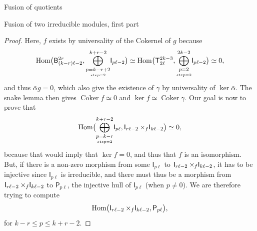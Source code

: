 \documentclass[reqno]{amsart}
\newcommand{\dl}[1]{\mathsf I_{#1}}
\newcommand{\dP}[1]{\mathsf P_{#1}}
\newcommand{\xf}{\times\hspace{-0.27em}_f}
\newcommand{\T}[2]{\mathsf{T}^{#1}_{#2}}
\newcommand{\B}[2]{\mathsf{B}^{#1}_{#2}}
\newcommand{\lc}{\ell}
\newcommand{\Hom}[1]{\text{\rm{Hom}}\big( #1 \big)}
\DeclareMathOperator{\Coker}{Coker}
\begin{document}
\begin{section}{Fusion of quotients}
\begin{subsection}{Fusion of two irreducible modules, first part}
\begin{proof}
Here, $f$ exists by universality of the Cokernel of $g$ because
\begin{equation}
\Hom{\B{2 r}{(k-r)\lc -2},\overset{k+r-2}{\underset{\underset{step=2}{p=k-r+2}}{\bigoplus}}\dl{p \lc -2}} \simeq \Hom{\T{2k -3}{2\lc},\overset{2k-2}{\underset{\underset{step=2}{p=2}}{\bigoplus}}\dl{p \lc -2}} \simeq 0,
\end{equation} 
and thus $\bar{\alpha}g = 0$, which also give the existence of $\gamma$ by universality of $\ker \bar\alpha$.
 The snake lemma then gives $\Coker{f} \simeq 0$ and $\ker f \simeq \Coker{\gamma}$. Our goal is now to prove that 
\begin{equation}\label{eq:IvsI.Goal}
 \Hom{\overset{k+r-2}{\underset{\underset{step=2}{p=k-r}}{\bigoplus}}\dl{p \lc },\dl{r \lc -2}\xf \dl{k \lc -2} } \simeq 0, 
\end{equation}
because that would imply that $\ker f = 0 $, and thus that $f$ is an isomorphism. But, if there is a non-zero morphism from some $\dl{p\lc}$ to $\dl{r \lc -2}\xf \dl{k \lc -2}$, it has to be injective since $\dl{p\lc}$ is irreducible, and there must thus be a morphism from $\dl{r \lc -2}\xf \dl{k \lc -2}$ to $\dP{p\lc}$, the injective hull of $\dl{p\lc}$ (when $p\neq 0$). We are therefore trying to compute $$\Hom{\dl{r \lc -2}\xf \dl{k \lc -2}, \dP{p \lc}},$$ for $k-r \leq p \leq k+r-2$.
 

\end{proof}
\end{subsection}
\end{section}
\end{document}
